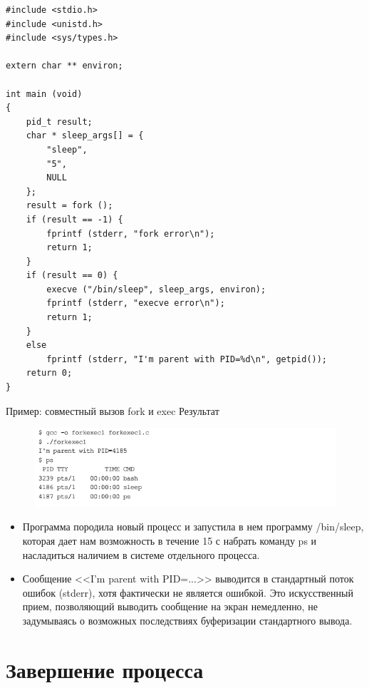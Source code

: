 \documentclass[xcolor=table]{beamer}
\begin{document}
\begin{frame}
	\begin{verbatim}
#include <stdio.h>
#include <unistd.h>
#include <sys/types.h>

extern char ** environ;

int main (void)
{
    pid_t result;
    char * sleep_args[] = {
        "sleep",
        "5",
        NULL
    };
    result = fork ();
    if (result == -1) {
        fprintf (stderr, "fork error\n");
        return 1;
    }
    if (result == 0) {
        execve ("/bin/sleep", sleep_args, environ);
        fprintf (stderr, "execve error\n");
        return 1;
    } 
    else 
        fprintf (stderr, "I'm parent with PID=%d\n", getpid());
    return 0;
}
	\end{verbatim}
\end{frame}

\begin{frame}{Пример: совместный вызов fork и exec}
Результат
\begin{figure}[h]
\centering
\includegraphics[scale=0.5]{images/lec07-pic41.png}
\end{figure}
\begin{itemize}
\item Программа породила новый процесс и запустила в нем программу
/bin/sleep, которая дает нам возможность в течение 15 с набрать команду ps и насладиться наличием в системе отдельного процесса.
\item Сообщение <<I'm parent with PID=...>> выводится в стандартный поток ошибок
(stderr), хотя фактически не является ошибкой. Это искусственный прием, позволяющий выводить сообщение на экран немедленно, не задумываясь о возможных
последствиях буферизации стандартного вывода.
\end{itemize}
\end{frame}

\section{Завершение процесса}
\end{document}

